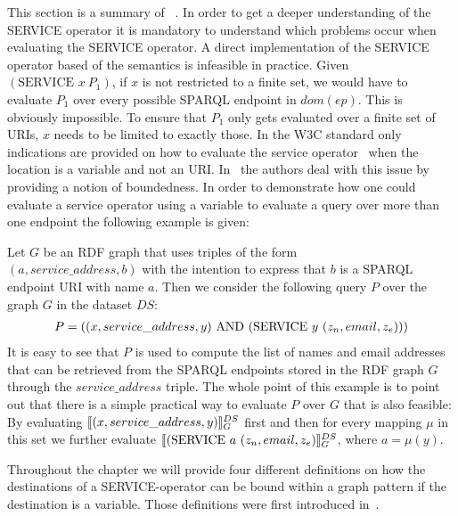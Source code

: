 This section is a summary of ~\cite[p. 4-7]{BuilAranda20131}. In order to get a
deeper understanding of the SERVICE operator it is mandatory to understand which
problems occur when evaluating the SERVICE operator.
A direct implementation of the SERVICE operator based of the semantics is
infeasible in practice. Given $(\mbox{SERVICE }  x \
P_1)$, if $x$ is not restricted to a finite set, we would have to evaluate $P_1$ over every 
possible SPARQL endpoint in $dom(ep)$. This is obviously impossible. To ensure that $P_1$
only gets evaluated over a finite set of URIs, $x$ needs to be limited to exactly
those. In the W3C standard only indications are provided on how to evaluate the
service operator~\cite{w3standardservice} when the location is a variable and
not an URI. In~\cite{BuilAranda20131} the authors deal with this issue by
providing a notion of boundedness. In order to demonstrate how one could
evaluate a service operator using a variable to evaluate a query over more than
one endpoint the following example is given:
\begin{example}
Let $G$ be an RDF graph that uses triples of the form\\ $(a, service\_address,b)$
with the intention to express that $b$ is a SPARQL endpoint URI with name $a$.
Then we consider the following query $P$ over the graph $G$ in the dataset $DS$:
\begin{align*}
	P=((x, service\_address, y) \AND (\mbox{SERVICE } y \ (z_n,email,z_e)))
\end{align*}
It is easy to see that $P$ is used to compute the list of names and email
addresses that can be retrieved from the SPARQL endpoints stored in the RDF
graph $G$ through the $service\_address$ triple. 
The whole point of this example is to point out that there is a simple practical
way to evaluate $P$ over $G$ that is also feasible:
By evaluating $\llbracket (x,service\_address,y) \rrbracket^{DS}_G$ first and then for every
mapping $\mu$ in this set we further evaluate $\llbracket (\mbox{SERVICE } a \ (z_n, email, z_e)
\rrbracket^{DS}_G$, where $a = \mu(y)$. 
\end{example}
Throughout the chapter we will provide four different definitions on how the
destinations of a SERVICE-operator can be bound within a graph pattern if the
destination is a variable. Those definitions were first introduced
in~\cite{BuilAranda20131}.
